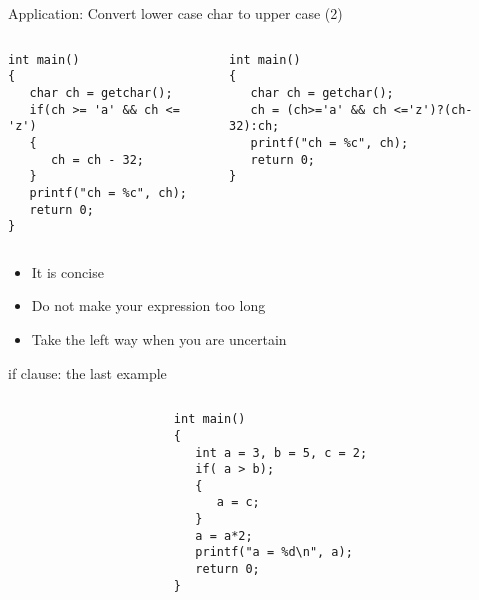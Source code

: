 \begin{frame}[fragile]{Application: Convert lower case char to upper case (2)}
\begin{columns}
\begin{column}{0.5\linewidth}
\begin{lstlisting}[basicstyle=\footnotesize, xleftmargin=0.02\linewidth]
int main()
{  
   char ch = getchar();
   if(ch >= 'a' && ch <= 'z')
   {
      ch = ch - 32;
   }
   printf("ch = %c", ch);
   return 0;
}
\end{lstlisting}
\end{column}
\begin{column}{0.5\linewidth}
\begin{lstlisting}[basicstyle=\footnotesize, xleftmargin=0.02\linewidth]
int main()
{  
   char ch = getchar();
   ch = (ch>='a' && ch <='z')?(ch-32):ch;
   printf("ch = %c", ch);
   return 0;
}
\end{lstlisting}
\end{column}
\end{columns}
\begin{itemize}
	\item {It is concise}
	\item {Do not make your expression too long}
	\item {Take the left way when you are uncertain}
\end{itemize}
\end{frame}

\begin{frame}[fragile]{if clause: the last example}
\begin{columns}
\begin{column}{0.05\linewidth}
\end{column}
\begin{column}{0.48\linewidth}
\begin{lstlisting}[]
int main()
{
   int a = 3, b = 5, c = 2;
   if( a > b);
   {
      a = c;
   }
   a = a*2;
   printf("a = %d\n", a);
   return 0;
}
\end{lstlisting}
\end{column}
\end{columns}
\end{frame}


